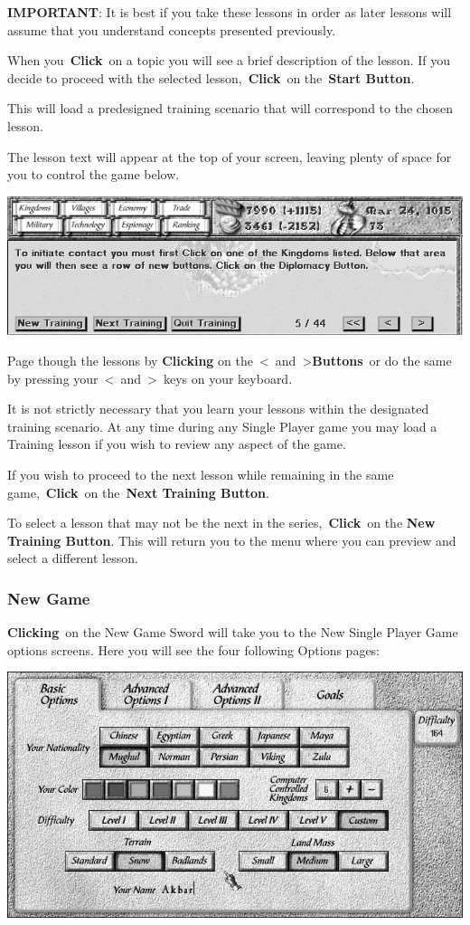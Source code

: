 \textbf{IMPORTANT}: It is best if you take these lessons in order as later lessons will assume that you understand concepts presented previously.

When you \textbf{Click} on a topic you will see a brief description of the lesson. If you decide to proceed with the selected lesson, \textbf{Click} on the \textbf{Start Button}.

This will load a predesigned training scenario that will correspond to the chosen lesson.

The lesson text will appear at the top of your screen, leaving plenty of space for you to control the game below.

\begin{center}
	\includegraphics[width=0.7\linewidth]{Ilesson}
\end{center}


Page though the lessons by \textbf{Clicking} on the \textless and \textgreater \textbf{Buttons} or do the same by pressing your \textless and \textgreater keys on your keyboard.

It is not strictly necessary that you learn your lessons within the designated training scenario. At any time during any Single Player game you may load a Training lesson if you wish to review any aspect of the game.

If you wish to proceed to the next lesson while remaining in the same game, \textbf{Click} on the \textbf{Next Training Button}.

To select a lesson that may not be the next in the series, \textbf{Click} on the \textbf{New Training Button}. This will return you to the menu where you can preview and select a different lesson.

\subsubsection{New Game}

\textbf{Clicking} on the New Game Sword will take you to the New Single Player Game options screens. Here you will see the four following Options pages:

\begin{center}
	\includegraphics[width=0.7\linewidth]{Ibasicoptions}
\end{center}


